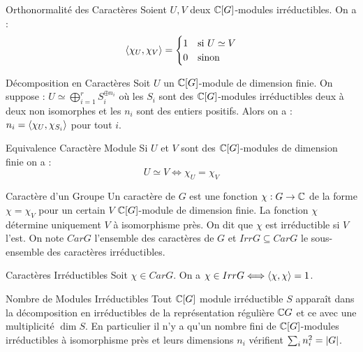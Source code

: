 \documentclass{cours}
\begin{document}
\begin{théorème}{Orthonormalité des Caractères}{}
    Soient $U, V$ deux $\mathbb{C}[G]$-modules irréductibles. On a :
    \[
        \left\langle \chi_{U}, \chi_{V} \right\rangle = \begin{cases}
            1 & \text{si } U \simeq V \\
            0 & \text{sinon}
        \end{cases}
    \]
\end{théorème}
\begin{corollaire}{Décomposition en Caractères}{}
    Soit $U$ un $\mathbb{C}[G]$-module de dimension finie. On suppose : $U \simeq \bigoplus_{i = 1}^{r} S_{i}^{\oplus n_{i}}$
    où les $S_{i}$ sont des $\mathbb{C}[G]$-modules irréductibles deux à deux non isomorphes et les $n_{i}$ sont des entiers positifs.
    Alors on a : $n_{i} = \left\langle \chi_{U}, \chi_{S_{i}} \right\rangle$ pour tout $i$.
\end{corollaire}

\begin{corollaire}{Equivalence Caractère Module}{}
    Si $U$ et $V$ sont des $\mathbb{C}[G]$-modules de dimension finie on a :
    \[
        U \simeq V \Longleftrightarrow \chi_{U} = \chi_{V}
    \]
\end{corollaire}

\begin{définition}{Caractère d'un Groupe}{}
    Un caractère de $G$ est une fonction $\chi : G \rightarrow \mathbb{C}$ de la forme $\chi = \chi_V$ pour un certain $V$ $\mathbb{C}[G]$-module de dimension finie. La fonction $\chi$ détermine uniquement $V$ à isomorphisme près. On dit que $\chi$ est irréductible si $V$ l'est. On note $Car G$ l'ensemble des caractères de $G$ et $Irr G \subseteq Car G$ le sous-ensemble des caractères irréductibles.
\end{définition}

\begin{corollaire}{Caractères Irréductibles}{}
    Soit $\chi \in Car G$. On a $\chi \in Irr G \Longleftrightarrow \left\langle \chi, \chi \right\rangle = 1$.
\end{corollaire}

\begin{corollaire}{Nombre de Modules Irréductibles}{}
    Tout $\mathbb{C}[G]$ module irréductible $S$ apparaît dans la décomposition en irréductibles de la représentation régulière $\mathbb{C} G$ et ce avec une multiplicité $\dim S$. En particulier il n'y a qu'un nombre fini de $\mathbb{C}[G]$-modules irréductibles à isomorphisme près et leurs dimensions $n_{i}$ vérifient $\sum_{i}n_{i}^{2} = \left|G\right|$.
\end{corollaire}
\end{document}
